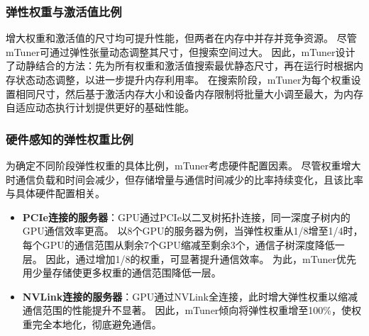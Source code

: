 \subsubsection{弹性权重与激活值比例}  

增大权重和激活值的尺寸均可提升性能，但两者在内存中并存并竞争资源。
尽管mTuner可通过弹性张量动态调整其尺寸，但搜索空间过大。
因此，mTuner设计了动静结合的方法：先为所有权重和激活值搜索最优静态尺寸，再在运行时根据内存状态动态调整，以进一步提升内存利用率。  
在搜索阶段，mTuner为每个权重设置相同尺寸，然后基于激活内存大小和设备内存限制将批量大小调至最大，为内存自适应动态执行计划提供更好的基础性能。  


\subsubsection{硬件感知的弹性权重比例}  
为确定不同阶段弹性权重的具体比例，mTuner考虑硬件配置因素。
尽管权重增大时通信负载和时间会减少，但存储增量与通信时间减少的比率持续变化，且该比率与具体硬件配置相关。  
\begin{itemize}
    \item \textbf{PCIe连接的服务器}：GPU通过PCIe以二叉树拓扑连接，同一深度子树内的GPU通信效率更高。
    以8个GPU的服务器为例，当弹性权重从1/8增至1/4时，每个GPU的通信范围从剩余7个GPU缩减至剩余3个，通信子树深度降低一层。
    因此，通过增加1/8的权重，可显著提升通信效率。
    为此，mTuner优先用少量存储使更多权重的通信范围降低一层。  
    \item \textbf{NVLink连接的服务器}：GPU通过NVLink全连接，此时增大弹性权重以缩减通信范围的性能提升不显著。
    因此，mTuner倾向将弹性权重增至100\%，使权重完全本地化，彻底避免通信。
\end{itemize}





